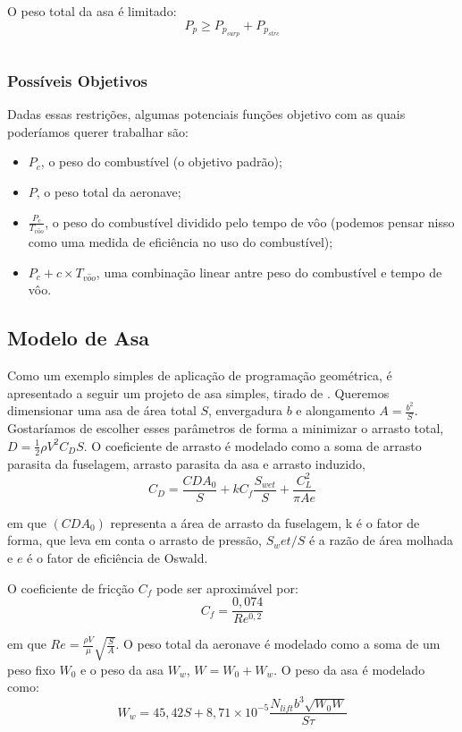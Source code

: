 \documentclass{article}
\begin{document}
O peso total da asa é limitado:
\[
  P_p \geq P_{p_{surp}} + P_{p_{strc}}
\]

\inputminted{python}{../Exemplos/Cap15/prog4_wwb.py}

\subsubsection{Possíveis Objetivos}

Dadas essas restrições, algumas potenciais funções objetivo com as
quais poderíamos querer trabalhar são:

\begin{itemize}
\item $P_c$, o peso do combustível (o objetivo padrão);
\item $P$, o peso total da aeronave;
\item $\frac{P_c}{T_{v\hat{o}o}}$, o peso do combustível dividido
  pelo tempo de vôo (podemos pensar nisso como uma medida de
  eficiência no uso do combustível);
\item $P_c + c \times T_{v\hat{o}o}$, uma combinação linear antre
  peso do combustível e tempo de vôo.
\end{itemize}




\subsection{Modelo de Asa}
Como um exemplo simples de aplicação de programação geométrica, é
apresentado a seguir um projeto de asa simples, tirado de \cite{warren}.
Queremos dimensionar uma asa de área total $S$, envergadura $b$ e
alongamento $A = \frac{b^2}{S}$. Gostaríamos de escolher esses parâmetros
de forma a minimizar o arrasto total, $D = \frac{1}{2}\rho V^2 C_D S$.
O coeficiente de arrasto é modelado como a soma de arrasto parasita da
fuselagem, arrasto parasita da asa e arrasto induzido,
\[
C_D = \frac{CDA_0}{S} + kC_f \frac{S_{wet}}{S} + \frac{C_{L}^2}{\pi A
  e}
\]

\noindent em que $(CDA_0)$ representa a área de arrasto da fuselagem, k é o
fator de forma, que leva em conta o arrasto de pressão, $S_wet/S$ é a razão
de área molhada e $e$ é o fator de eficiência de Oswald.

O coeficiente de fricção $C_f$ pode ser aproximável por:
\[
C_f = \frac{0,074}{Re^{0,2}}
\]

\noindent em que $Re = \frac{\rho V}{\mu} \sqrt{\frac{S}{A}}$. O peso total
da aeronave é modelado como a soma de um peso fixo $W_0$ e o peso da asa
$W_w$, $W = W_0 + W_w$. O peso da asa é modelado como:
\[
W_w = 45,42S + 8,71\times10^{-5} \frac{N_{lift}b^3\sqrt{W_0W}}{S\tau}
\]
\end{document}
